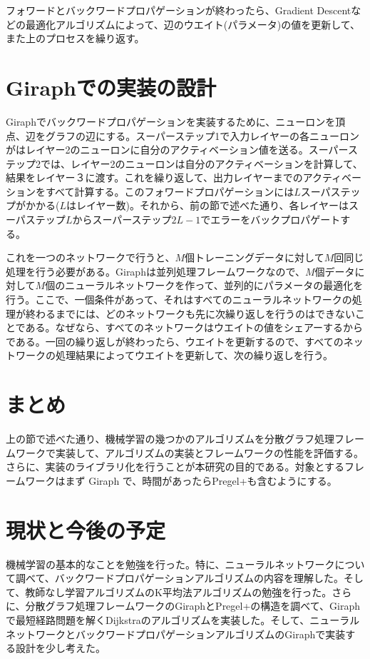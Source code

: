 \documentclass[]{iplresume} %
\begin{document}
フォワードとバックワードプロパゲーションが終わったら、Gradient Descentなどの最適化アルゴリズムによって、辺のウエイト(パラメータ)の値を更新して、また上のプロセスを繰り返す。

\section{Giraphでの実装の設計}
Giraphでバックワードプロパゲーションを実装するために、ニューロンを頂点、辺をグラフの辺にする。スーパーステップ1で入力レイヤーの各ニューロンがはレイヤー2のニューロンに自分のアクティベーション値を送る。スーパーステップ2では、レイヤー2のニューロンは自分のアクティベーションを計算して、結果をレイヤー３に渡す。これを繰り返して、出力レイヤーまでのアクティベーションをすべて計算する。このフォワードプロパゲーションには$L$スーパステップがかかる($L$はレイヤー数)。それから、前の節で述べた通り、各レイヤーはスーパステップ$L$からスーパーステップ$2L-1$でエラーをバックプロパゲートする。

これを一つのネットワークで行うと、$M$個トレーニングデータに対して$M$回同じ処理を行う必要がある。Giraphは並列処理フレームワークなので、$M$個データに対して$M$個のニューラルネットワークを作って、並列的にパラメータの最適化を行う。ここで、一個条件があって、それはすべてのニューラルネットワークの処理が終わるまでには、どのネットワークも先に次繰り返しを行うのはできないことである。なぜなら、すべてのネットワークはウエイトの値をシェアーするからである。一回の繰り返しが終わったら、ウエイトを更新するので、すべてのネットワークの処理結果によってウエイトを更新して、次の繰り返しを行う。

\section{まとめ}
上の節で述べた通り、機械学習の幾つかのアルゴリズムを分散グラフ処理フレームワークで実装して、アルゴリズムの実装とフレームワークの性能を評価する。さらに、実装のライブラリ化を行うことが本研究の目的である。対象とするフレームワークはまず Giraph で、時間があったらPregel+も含むようにする。

\section{現状と今後の予定}
機械学習の基本的なことを勉強を行った。特に、ニューラルネットワークについて調べて、バックワードプロパゲーションアルゴリズムの内容を理解した。そして、教師なし学習アルゴリズムのK平均法アルゴリズムの勉強を行った。さらに、分散グラフ処理フレームワークのGiraphとPregel+の構造を調べて、Giraphで最短経路問題を解くDijkstraのアルゴリズムを実装した。そして、ニューラルネットワークとバックワードプロパゲーションアルゴリズムのGiraphで実装する設計を少し考えた。
\end{document}
